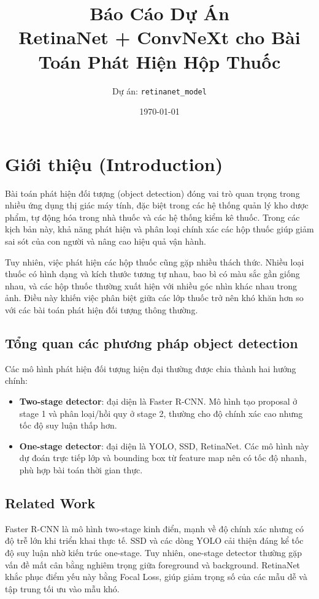 \documentclass[12pt,a4paper]{article}
\title{\textbf{Báo Cáo Dự Án}\\
RetinaNet + ConvNeXt cho Bài Toán Phát Hiện Hộp Thuốc}
\author{Dự án: \texttt{retinanet\_model}}
\date{\today}
\begin{document}
\maketitle
\tableofcontents
\newpage

\section{Giới thiệu (Introduction)}

Bài toán phát hiện đối tượng (object detection) đóng vai trò quan trọng trong nhiều ứng dụng thị giác máy tính, đặc biệt trong các hệ thống quản lý kho dược phẩm, tự động hóa trong nhà thuốc và các hệ thống kiểm kê thuốc. Trong các kịch bản này, khả năng phát hiện và phân loại chính xác các hộp thuốc giúp giảm sai sót của con người và nâng cao hiệu quả vận hành.

Tuy nhiên, việc phát hiện các hộp thuốc cũng gặp nhiều thách thức. Nhiều loại thuốc có hình dạng và kích thước tương tự nhau, bao bì có màu sắc gần giống nhau, và các hộp thuốc thường xuất hiện với nhiều góc nhìn khác nhau trong ảnh. Điều này khiến việc phân biệt giữa các lớp thuốc trở nên khó khăn hơn so với các bài toán phát hiện đối tượng thông thường.

\subsection{Tổng quan các phương pháp object detection}

Các mô hình phát hiện đối tượng hiện đại thường được chia thành hai hướng chính:
\begin{itemize}
    \item \textbf{Two-stage detector}: đại diện là Faster R-CNN. Mô hình tạo proposal ở stage 1 và phân loại/hồi quy ở stage 2, thường cho độ chính xác cao nhưng tốc độ suy luận thấp hơn.
    \item \textbf{One-stage detector}: đại diện là YOLO, SSD, RetinaNet. Các mô hình này dự đoán trực tiếp lớp và bounding box từ feature map nên có tốc độ nhanh, phù hợp bài toán thời gian thực.
\end{itemize}

\subsection{Related Work}

Faster R-CNN là mô hình two-stage kinh điển, mạnh về độ chính xác nhưng có độ trễ lớn khi triển khai thực tế. SSD và các dòng YOLO cải thiện đáng kể tốc độ suy luận nhờ kiến trúc one-stage. Tuy nhiên, one-stage detector thường gặp vấn đề mất cân bằng nghiêm trọng giữa foreground và background. RetinaNet khắc phục điểm yếu này bằng Focal Loss, giúp giảm trọng số của các mẫu dễ và tập trung tối ưu vào mẫu khó.
\end{document}
